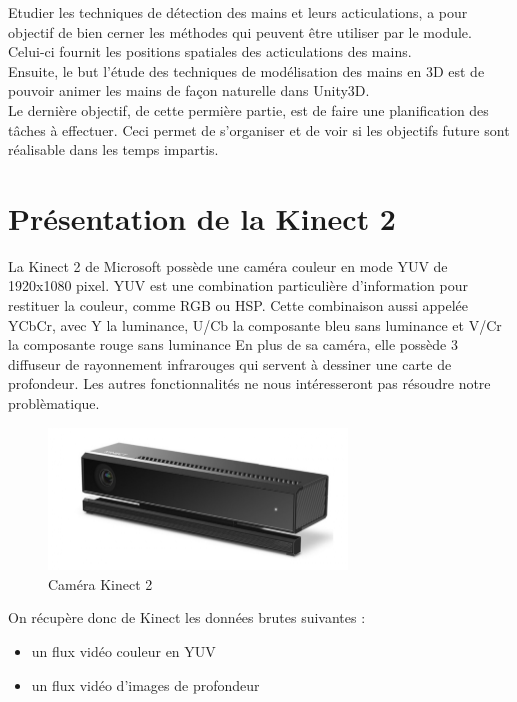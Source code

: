 Etudier les techniques de détection des mains et leurs acticulations, 
a pour objectif de bien cerner les méthodes qui peuvent être utiliser 
par le module. Celui-ci fournit les positions spatiales des 
acticulations des mains.\\

Ensuite, le but l'étude des techniques de modélisation des mains en 
3D est de pouvoir animer les mains de façon naturelle dans Unity3D.\\

Le dernière objectif, de cette permière partie, est de faire une 
planification des tâches à effectuer. Ceci permet de s'organiser et 
de voir si les objectifs future sont réalisable dans les temps 
impartis.\\  


\section{Présentation de la Kinect 2}
La Kinect 2 de Microsoft possède une caméra couleur en mode YUV de 1920x1080 pixel.
YUV est une combination particulière d'information pour restituer la couleur, comme RGB ou HSP.
Cette combinaison aussi appelée YCbCr, avec Y la luminance, U/Cb la composante bleu sans luminance et V/Cr la composante rouge sans luminance
En plus de sa caméra, elle possède 3 diffuseur de rayonnement infrarouges qui servent à dessiner une carte de profondeur.
Les autres fonctionnalités ne nous intéresseront pas résoudre notre problèmatique.\\

\begin{figure}[H]
 \center
 \includegraphics[width=300px]{images/kinect-v2.png}
 \caption{Caméra Kinect 2}
\end{figure}

On récupère donc de Kinect les données brutes suivantes : 
\begin{itemize}
 \item un flux vidéo couleur en YUV
 \item un flux vidéo d'images de profondeur
\end{itemize}

